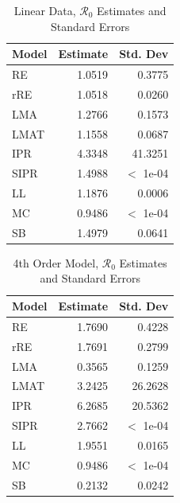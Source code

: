 \documentclass[12pt]{article}
\newcommand{\rr}{\ensuremath{\mathcal{R}_0}}
\begin{document}
\begin{table}[H]
	
	\centering
	\begin{tabular}[t]{l|r|r}
		\hline
		Model & Estimate & Std. Dev\\
		\hline
		RE & 1.0519 & 0.3775\\
		\hline
		rRE & 1.0518 & 0.0260\\
		\hline
		LMA & 1.2766 & 0.1573\\
		\hline
		LMAT & 1.1558 & 0.0687\\
		\hline
		IPR & 4.3348 & 41.3251\\
		\hline
		SIPR & 1.4988 & $<$ 1e-04\\
		\hline
		LL & 1.1876 & 0.0006\\
		\hline
		MC & 0.9486 & $<$ 1e-04\\
		\hline
		SB & 1.4979 & 0.0641\\
		\hline
	\end{tabular}
	\caption{Linear Data, $\rr$ Estimates and Standard Errors}
\end{table}

\begin{table}[H]
	
	
	\centering
	\begin{tabular}[t]{l|r|r}
		\hline
		Model & Estimate & Std. Dev\\
		\hline
		RE & 1.7690 & 0.4228\\
		\hline
		rRE & 1.7691 & 0.2799\\
		\hline
		LMA & 0.3565 & 0.1259\\
		\hline
		LMAT & 3.2425 & 26.2628\\
		\hline
		IPR & 6.2685 & 20.5362\\
		\hline
		SIPR & 2.7662 & $<$ 1e-04\\
		\hline
		LL & 1.9551 & 0.0165\\
		\hline
		MC & 0.9486 & $<$ 1e-04\\
		\hline
		SB & 0.2132 & 0.0242\\
		\hline
	\end{tabular}
	\caption{4th Order Model, $\rr$ Estimates and Standard Errors}
\end{table}
\end{document}

